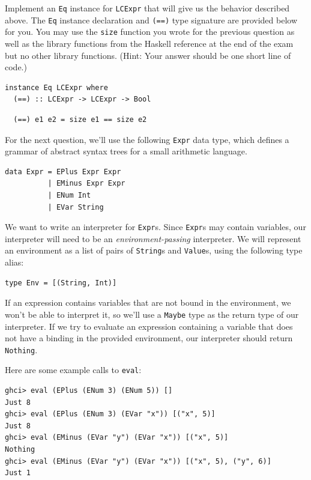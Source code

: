\documentclass[addpoints]{exam}
\begin{document}
\begin{questions}
Implement an \texttt{Eq} instance for \texttt{LCExpr} that will give us the behavior described above.  The \texttt{Eq} instance declaration and \texttt{(==)} type signature are provided below for you.  You may use the \texttt{size} function you wrote for the previous question as well as the library functions from the Haskell reference at the end of the exam but no other library functions.  (Hint: Your answer should be one short line of code.)

\begin{verbatim}
instance Eq LCExpr where
  (==) :: LCExpr -> LCExpr -> Bool
\end{verbatim}
\begin{solutionorbox}[0.7in]
\begin{verbatim}  
  (==) e1 e2 = size e1 == size e2
\end{verbatim}
\end{solutionorbox}

\newpage

\noindent For the next question, we'll use the following \verb|Expr| data type, which defines a grammar of abstract syntax trees for a small arithmetic language.

\begin{verbatim}
data Expr = EPlus Expr Expr
          | EMinus Expr Expr
          | ENum Int
          | EVar String
\end{verbatim}

We want to write an interpreter for \verb|Expr|s.  Since \verb|Expr|s may contain variables, our interpreter will need to be an \emph{environment-passing} interpreter.  We will represent an environment as a list of pairs of \verb|String|s and \verb|Value|s, using the following type alias:

\begin{verbatim}
type Env = [(String, Int)]
\end{verbatim}

If an expression contains variables that are not bound in the environment, we won't be able to interpret it, so we'll use a \verb|Maybe| type as the return type of our interpreter.  If we try to evaluate an expression containing a variable that does not have a binding in the provided environment, our interpreter should return \verb|Nothing|.

Here are some example calls to \verb|eval|:

\begin{verbatim}
ghci> eval (EPlus (ENum 3) (ENum 5)) []
Just 8
ghci> eval (EPlus (ENum 3) (EVar "x")) [("x", 5)]
Just 8
ghci> eval (EMinus (EVar "y") (EVar "x")) [("x", 5)]
Nothing
ghci> eval (EMinus (EVar "y") (EVar "x")) [("x", 5), ("y", 6)]
Just 1
\end{verbatim}


\end{questions}
\end{document}
